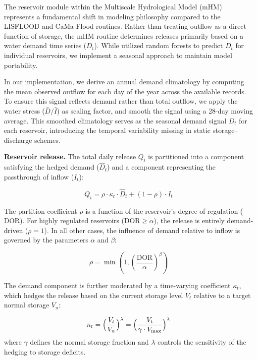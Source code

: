 \documentclass[hess, manuscript]{copernicus}
\begin{document}
The reservoir module within the Multiscale Hydrological Model (mHM) \citep{Samaniego2010, Kumar2013, Thober2019} represents a fundamental shift in modeling philosophy compared to the LISFLOOD and CaMa-Flood routines. Rather than treating outflow as a direct function of storage, the mHM routine determines releases primarily based on a water demand time series ($D_t$). While \citet{Shrestha2024} utilized random forests to predict $D_t$ for individual reservoirs, we implement a seasonal approach to maintain model portability.

In our implementation, we derive an annual demand climatology by computing the mean observed outflow for each day of the year across the available records. To ensure this signal reflects demand rather than total outflow, we apply the water stress ($\bar{D} / \bar{I}$) as scaling factor, and smooth the signal using a 28-day moving average. This smoothed climatology serves as the seasonal demand signal $D_t$ for each reservoir, introducing the temporal variability missing in static storage–discharge schemes.

\medskip
\textbf{Reservoir release.} The total daily release $Q_t$ is partitioned into a component satisfying the hedged demand ($\hat{D}_t$) and a component representing the passthrough of inflow ($I_t$):

\begin{equation}
\label{eq:mhm}
    Q_t = \rho \cdot \kappa_t \cdot \hat{D}_t + (1 - \rho) \cdot I_t
\end{equation}

The partition coefficient $\rho$ is a function of the reservoir's degree of regulation ($\text{DOR}$). For highly regulated reservoirs ($\text{DOR} \geq \alpha$), the release is entirely demand-driven ($\rho = 1$). In all other cases, the influence of demand relative to inflow is governed by the parameters $\alpha$ and $\beta$:

\begin{equation}
\label{eq:partition_coeff}
    \rho = \min\left(1, \left( \frac{\text{DOR}}{\alpha} \right)^\beta \right)
\end{equation}

The demand component is further moderated by a time-varying coefficient $\kappa_t$, which hedges the release based on the current storage level $V_t$ relative to a target normal storage $V_n$:

\begin{equation}
\label{eq:mhm_kappa}
    \kappa_t = \Bigl( \frac{V_t}{V_n} \Bigr)^\lambda = \Bigl( \frac{V_t}{\gamma \cdot V_{\max}} \Bigr)^\lambda
\end{equation}
where $\gamma$ defines the normal storage fraction and $\lambda$ controls the sensitivity of the hedging to storage deficits.
\end{document}
